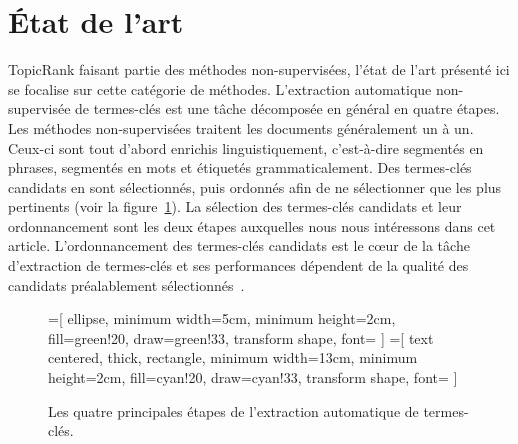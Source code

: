 \section{État de l'art}
\label{sec:etat_de_l_art}
  TopicRank faisant partie des méthodes non-supervisées, l'état de l'art
  présenté ici se focalise sur cette catégorie de méthodes. L'extraction
  automatique non-supervisée de termes-clés est une tâche décomposée en général
  en quatre étapes. Les méthodes non-supervisées traitent les documents
  généralement un à un. Ceux-ci sont tout d'abord enrichis linguistiquement,
  c'est-à-dire segmentés en phrases, segmentés en mots  et étiquetés
  grammaticalement. Des termes-clés candidats en sont sélectionnés, puis
  ordonnés afin de ne sélectionner que les plus pertinents (voir la
  figure~\ref{fig:etapes_de_l_extraction_de_termes_cles}). La sélection des
  termes-clés candidats et leur ordonnancement sont les deux étapes auxquelles
  nous nous intéressons dans cet article. L'ordonnancement des termes-clés
  candidats est le c\oe{}ur de la tâche d'extraction de termes-clés et ses
  performances dépendent de la qualité des candidats préalablement
  sélectionnés~\cite{wang2014keyphraseextractionpreprocessing}.
  \begin{figure}
    =[
      ellipse,
      minimum width=5cm,
      minimum height=2cm,
      fill=green!20,
      draw=green!33,
      transform shape,
      font={\huge}
    ]
    =[
      text centered,
      thick,
      rectangle,
      minimum width=13cm,
      minimum height=2cm,
      fill=cyan!20,
      draw=cyan!33,
      transform shape,
      font={\huge\bfseries}
    ]

    \centering
    \caption{Les quatre principales étapes de l'extraction automatique de
             termes-clés. \label{fig:etapes_de_l_extraction_de_termes_cles}}
  \end{figure}

